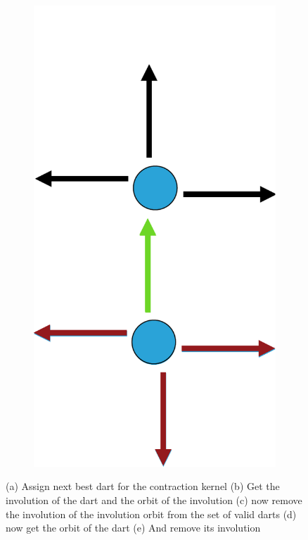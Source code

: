 \documentclass[12pt]{article}
\begin{document}
\begin{figure}[tb]
\begin{subfigure}[b]{0.15\textwidth}
      \includegraphics[width=\textwidth]{img/5}
      \caption{}\label{fig:contraction_kernel_greedy5}
  \end{subfigure}

  \caption{(a) Assign next best dart for the contraction kernel (b) Get the involution of the dart and the orbit of the involution (c) now remove the involution of the involution orbit from the set of valid darts (d) now get the orbit of the dart (e) And remove its involution}%
  \label{fig:contraction_kernel_greedy}
\end{figure}
\end{document}

